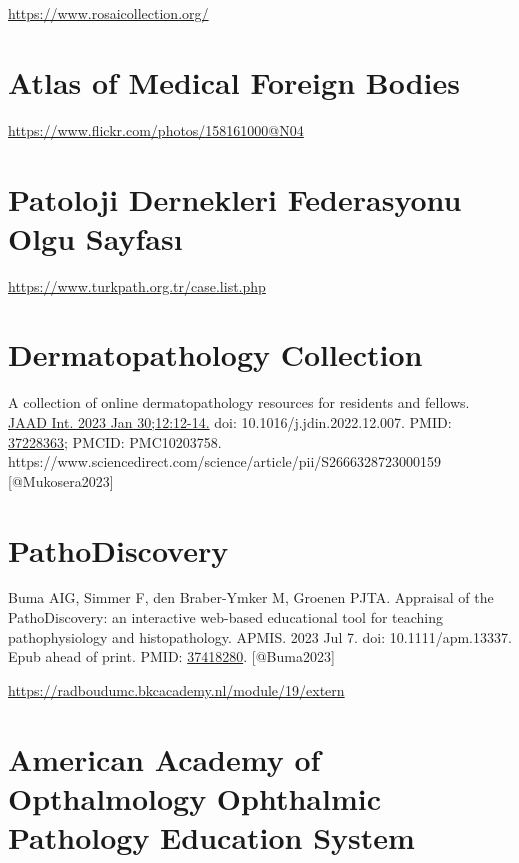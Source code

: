 \documentclass[
  letterpaper,
  DIV=11,
  numbers=noendperiod]{scrreprt}
\begin{document}
\url{https://www.rosaicollection.org/}

\hypertarget{sec-atlas-of-medical-foreign-bodies}{%
\section{Atlas of Medical Foreign
Bodies}\label{sec-atlas-of-medical-foreign-bodies}}

\url{https://www.flickr.com/photos/158161000@N04}

\hypertarget{patoloji-dernekleri-federasyonu-olgu-sayfasux131}{%
\section{Patoloji Dernekleri Federasyonu Olgu
Sayfası}\label{patoloji-dernekleri-federasyonu-olgu-sayfasux131}}

\url{https://www.turkpath.org.tr/case.list.php}

\hypertarget{dermatopathology-collection}{%
\section{Dermatopathology
Collection}\label{dermatopathology-collection}}

A collection of online dermatopathology resources for residents and
fellows.
\href{https://www.jaadinternational.org/article/S2666-3287(23)00015-9/fulltext}{JAAD
Int. 2023 Jan 30;12:12-14.} doi: 10.1016/j.jdin.2022.12.007. PMID:
\href{https://pubmed.ncbi.nlm.nih.gov/37228363/}{37228363}; PMCID:
PMC10203758.
https://www.sciencedirect.com/science/article/pii/S2666328723000159
{[}@Mukosera2023{]}

\hypertarget{pathodiscovery}{%
\section{PathoDiscovery}\label{pathodiscovery}}

Buma AIG, Simmer F, den Braber-Ymker M, Groenen PJTA. Appraisal of the
PathoDiscovery: an interactive web-based educational tool for teaching
pathophysiology and histopathology. APMIS. 2023 Jul 7. doi:
10.1111/apm.13337. Epub ahead of print. PMID:
\href{https://pubmed.ncbi.nlm.nih.gov/37418280/}{37418280}.
{[}@Buma2023{]}

\url{https://radboudumc.bkcacademy.nl/module/19/extern}

\hypertarget{american-academy-of-opthalmology-ophthalmic-pathology-education-system}{%
\section{American Academy of Opthalmology Ophthalmic Pathology Education
System}\label{american-academy-of-opthalmology-ophthalmic-pathology-education-system}}
\end{document}
